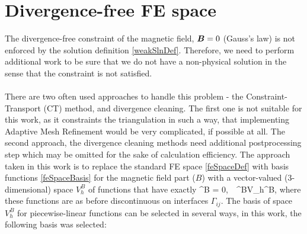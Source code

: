 \section{Divergence-free FE space}
\label{sec:divFreeSpace}
The divergence-free constraint of the magnetic field, $\mbox{\boldmath $B$} = 0$ (Gauss's law) is not enforced by the solution definition \cref{weakSlnDef}. Therefore, we need to perform additional work to be sure that we do not have a non-physical solution in the sense that the constraint is not satisfied.
\paragraph{}
There are two often used approaches to handle this problem - the Constraint-Transport (CT) method, and divergence cleaning. The first one is not suitable for this work, as it constraints the triangulation in such a way, that implementing Adaptive Mesh Refinement would be very complicated, if possible at all. The second approach, the divergence cleaning methods need additional postprocessing step which may be omitted for the sake of calculation efficiency. The approach taken in this work is to replace the standard FE space  \cref{feSpaceDef} with basis functions \cref{feSpaceBasis} for the magnetic field part ($B$) with a vector-valued (3-dimensional) space $V_h^B$ of functions that have exactly
\be
\nabla \cdot \mrvh^B = 0,\ \ \mrvh^B\in V_h^B,
\ee
where these functions are as before discontinuous on interfaces $\Gamma_{ij}$.
The basis of space $V_h^B$ for piecewise-linear functions can be selected in several ways, in this work, the following basis was selected:
